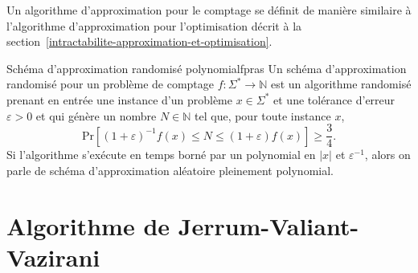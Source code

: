 Un algorithme d'approximation pour le comptage se définit de manière similaire à l'algorithme d'approximation pour l'optimisation décrit à la section~\ref{intractabilite-approximation-et-optimisation}.

\begin{maindefinition}{Schéma d'approximation randomisé polynomial}{fpras}
    Un schéma d'approximation randomisé pour un problème de comptage $f: \Sigma^{*} \to \mathbb{N}$ est un algorithme randomisé prenant en entrée une instance d'un problème $x \in \Sigma^{*}$ et une tolérance d'erreur $\varepsilon > 0$ et qui génère un nombre $N \in \mathbb{N}$ tel que, pour toute instance $x$,
    \begin{equation*}
        \mathrm{ Pr }\left[(1+\varepsilon)^{-1} f(x) \leq N \leq (1+\varepsilon)f(x)\right] \geq \frac{3}{4} .
    \end{equation*}
    Si l'algorithme s'exécute en temps borné par un polynomial en $\lvert x \rvert$ et $\varepsilon^{-1}$, alors on parle de schéma d'approximation aléatoire pleinement polynomial.
\end{maindefinition}


\section{Algorithme de Jerrum-Valiant-Vazirani}
\label{sec:algorithme-jvv}

